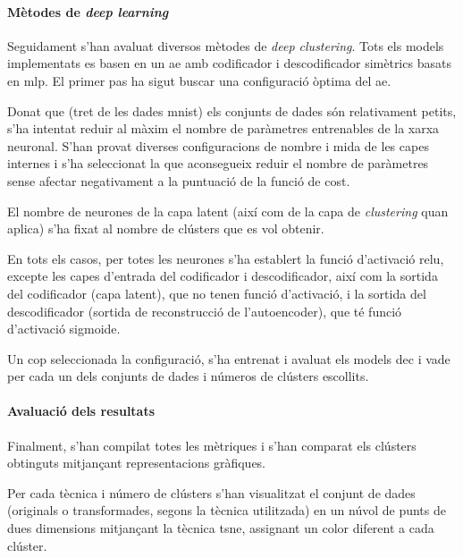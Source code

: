 \documentclass[CAT,BIB]{TFUOC}%
\begin{document}
    \paragraph{Mètodes de \textit{deep learning}}
        Seguidament
        s'han avaluat diversos mètodes de \textit{deep clustering}.
        Tots els models implementats es basen en un \gls{ae}
        amb codificador i descodificador simètrics
        basats en \gls{mlp}.
        El primer pas ha sigut buscar una configuració òptima del \gls{ae}.

        Donat que (tret de les dades \gls{mnist}) els conjunts de dades són relativament petits,
        s'ha intentat reduir al màxim el nombre de paràmetres entrenables de la xarxa neuronal.
        S'han provat diverses configuracions de nombre i mida de les capes internes
        i s'ha seleccionat la que aconsegueix reduir el nombre de paràmetres
        sense afectar negativament a la puntuació de la funció de cost.

        El nombre de neurones de la capa latent
        (així com de la capa de \textit{clustering} quan aplica)
        s'ha fixat al nombre de clústers que es vol obtenir.

        En tots els casos,
        per totes les neurones s'ha establert la funció d'activació \gls{relu},
        excepte les capes d'entrada del codificador i descodificador,
        així com la sortida del codificador (capa latent),
        que no tenen funció d'activació,
        i la sortida del descodificador (sortida de reconstrucció de l'autoencoder),
        que té funció d'activació sigmoide.

        Un cop seleccionada la configuració,
        s'ha entrenat i avaluat els models \gls{dec} i \gls{vade}
        per cada un dels conjunts de dades
        i números de clústers escollits.

    \paragraph{Avaluació dels resultats}
        Finalment,
        s'han compilat totes les mètriques
        i s'han comparat els clústers obtinguts
        mitjançant representacions gràfiques.

        Per cada tècnica i número de clústers
        s'han visualitzat el conjunt de dades
        (originals o transformades, segons la tècnica utilitzada)
        en un núvol de punts de dues dimensions
        mitjançant la tècnica \gls{tsne},
        assignant un color diferent a cada clúster.
\end{document}
